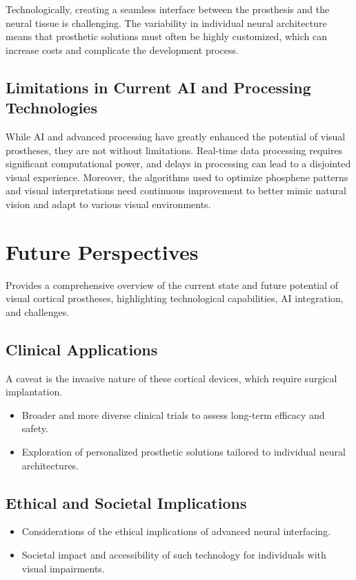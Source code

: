 \documentclass[twocolumn,10pt]{article}
\begin{document}
Technologically, creating a seamless interface between the prosthesis and the neural tissue is challenging. The variability in individual neural architecture means that prosthetic solutions must often be highly customized, which can increase costs and complicate the development process.

\subsection*{Limitations in Current AI and Processing Technologies}
While AI and advanced processing have greatly enhanced the potential of visual prostheses, they are not without limitations. Real-time data processing requires significant computational power, and delays in processing can lead to a disjointed visual experience. Moreover, the algorithms used to optimize phosphene patterns and visual interpretations need continuous improvement to better mimic natural vision and adapt to various visual environments.

\section*{Future Perspectives}\label{sec:future}
Provides a comprehensive overview of the current state and future potential of
visual cortical prostheses, highlighting technological capabilities, AI
integration, and challenges.

\subsection*{Clinical Applications}
A caveat is the invasive nature of these cortical devices, which require
surgical implantation.

\begin{itemize}
      \item Broader and more diverse clinical trials to assess long-term efficacy
            and safety.
      \item Exploration of personalized prosthetic solutions tailored to
            individual neural architectures.
\end{itemize}

\subsection*{Ethical and Societal Implications}
\begin{itemize}
      \item Considerations of the ethical implications of advanced neural
            interfacing.
      \item Societal impact and accessibility of such technology for individuals
            with visual impairments.
\end{itemize}
\end{document}
